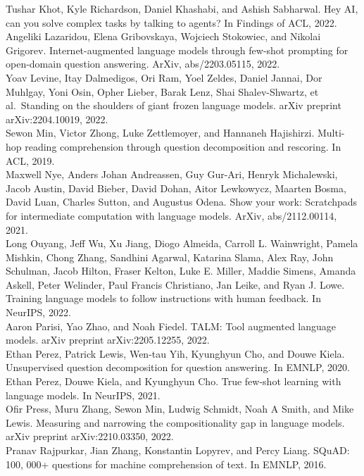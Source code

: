 \documentclass[
]{article}
\begin{document}
Tushar Khot, Kyle Richardson, Daniel Khashabi, and Ashish Sabharwal. Hey
AI, can you solve complex tasks by talking to agents? In Findings of
ACL, 2022.\\
Angeliki Lazaridou, Elena Gribovskaya, Wojciech Stokowiec, and Nikolai
Grigorev. Internet-augmented language models through few-shot prompting
for open-domain question answering. ArXiv, abs/2203.05115, 2022.\\
Yoav Levine, Itay Dalmedigos, Ori Ram, Yoel Zeldes, Daniel Jannai, Dor
Muhlgay, Yoni Osin, Opher Lieber, Barak Lenz, Shai Shalev-Shwartz, et
al.~Standing on the shoulders of giant frozen language models. arXiv
preprint arXiv:2204.10019, 2022.\\
Sewon Min, Victor Zhong, Luke Zettlemoyer, and Hannaneh Hajishirzi.
Multi-hop reading comprehension through question decomposition and
rescoring. In ACL, 2019.\\
Maxwell Nye, Anders Johan Andreassen, Guy Gur-Ari, Henryk Michalewski,
Jacob Austin, David Bieber, David Dohan, Aitor Lewkowycz, Maarten Bosma,
David Luan, Charles Sutton, and Augustus Odena. Show your work:
Scratchpads for intermediate computation with language models. ArXiv,
abs/2112.00114, 2021.\\
Long Ouyang, Jeff Wu, Xu Jiang, Diogo Almeida, Carroll L. Wainwright,
Pamela Mishkin, Chong Zhang, Sandhini Agarwal, Katarina Slama, Alex Ray,
John Schulman, Jacob Hilton, Fraser Kelton, Luke E. Miller, Maddie
Simens, Amanda Askell, Peter Welinder, Paul Francis Christiano, Jan
Leike, and Ryan J. Lowe. Training language models to follow instructions
with human feedback. In NeurIPS, 2022.\\
Aaron Parisi, Yao Zhao, and Noah Fiedel. TALM: Tool augmented language
models. arXiv preprint arXiv:2205.12255, 2022.\\
Ethan Perez, Patrick Lewis, Wen-tau Yih, Kyunghyun Cho, and Douwe Kiela.
Unsupervised question decomposition for question answering. In EMNLP,
2020.\\
Ethan Perez, Douwe Kiela, and Kyunghyun Cho. True few-shot learning with
language models. In NeurIPS, 2021.\\
Ofir Press, Muru Zhang, Sewon Min, Ludwig Schmidt, Noah A Smith, and
Mike Lewis. Measuring and narrowing the compositionality gap in language
models. arXiv preprint arXiv:2210.03350, 2022.\\
Pranav Rajpurkar, Jian Zhang, Konstantin Lopyrev, and Percy Liang.
SQuAD: 100, 000+ questions for machine comprehension of text. In EMNLP,
2016.\\
\end{document}
